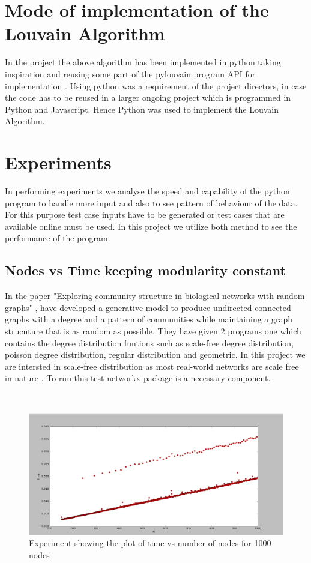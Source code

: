 \section{Mode of implementation of the Louvain Algorithm}
In the project the above algorithm has been implemented in python taking inspiration and reusing some part of the pylouvain program API for implementation \cite{pylouvain}. Using python was a requirement of the project directors, in case the code has to be reused in a larger ongoing project which is programmed in Python and Javascript. Hence Python was used to implement the Louvain Algorithm.

\section{Experiments}
In performing experiments we analyse the speed and capability of the python program to handle more input and also to see pattern of behaviour of the data. For this purpose test case inputs have to be generated or test cases that are available online must be used. 
In this project we utilize both method to see the performance of the program.
\subsection{Nodes vs Time keeping modularity constant}
\par In the paper "Exploring community structure in biological networks with random graphs" \cite{githubtest1}, have developed a generative model to produce undirected connected graphs with a degree and a pattern of communities while maintaining a graph strucuture that is as random as possible.  They have given 2 programs one which contains the degree distribution funtions such as scale-free degree  distribution, poisson degree distribution, regular distribution and geometric.  In this project we are intersted in scale-free distribution as most real-world networks are scale free in nature \cite{scalefree}. To run this test networkx package is a necessary component. 


\\
\begin{figure}[H]
\centering
\includegraphics[scale=0.3]{e1000.png}
\caption{Experiment showing the plot of time vs number of nodes for 1000 nodes}
\end{figure}

